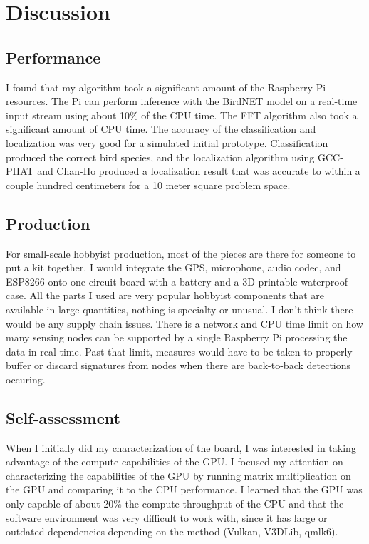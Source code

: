 \documentclass[12pt]{article}
\begin{document}
\section{Discussion}\label{sec:discussion}

\subsection{Performance}
	I found that my algorithm took a significant amount of the Raspberry Pi resources. The Pi can perform inference with the BirdNET model on a real-time input stream using about 10\% of the CPU time. The FFT algorithm also took a significant amount of CPU time. 
	The accuracy of the classification and localization was very good for a simulated initial prototype. Classification produced the correct bird species, and the localization algorithm using GCC-PHAT and Chan-Ho produced a localization result that was accurate to within a couple hundred centimeters for a 10 meter square problem space.

\subsection{Production}
	For small-scale hobbyist production, most of the pieces are there for someone to put a kit together. I would integrate the GPS, microphone, audio codec, and ESP8266 onto one circuit board with a battery and a 3D printable waterproof case. All the parts I used are very popular hobbyist components that are available in large quantities, nothing is specialty or unusual. I don't think there would be any supply chain issues. 
	There is a network and CPU time limit on how many sensing nodes can be supported by a single Raspberry Pi processing the data in real time. Past that limit, measures would have to be taken to properly buffer or discard signatures from nodes when there are back-to-back detections occuring.

\subsection{Self-assessment}
When I initially did my characterization of the board, I was interested in taking advantage of the compute capabilities of the GPU. I focused my attention on characterizing the capabilities of the GPU by running matrix multiplication on the GPU and comparing it to the CPU performance. I learned that the GPU was only capable of about 20\% the compute throughput of the CPU and that the software environment was very difficult to work with, since it has large or outdated dependencies depending on the method (Vulkan, V3DLib, qmlk6).
\end{document}
